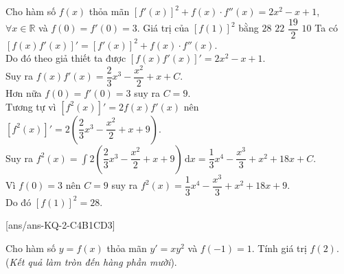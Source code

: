 \begin{ex}%
	Cho hàm số $ f(x)$ thỏa mãn $\left[f'(x)\right]^2+f(x)\cdot f''(x)=2x^2-x+1$, $\forall x\in\mathbb{R}$ và $ f(0)=f'(0)=3$. Giá trị của $\left[f(1)\right]^2$ bằng
	\choice
	{\True $ 28$}
	{$ 22$}
	{$\dfrac{19}{2}$}
	{$ 10$}
	\loigiai
	{
		Ta có $\left[f(x){f}'(x)\right]'=\left[f'(x)\right]^2+f(x)\cdot f''(x)$.\\
		Do đó theo giả thiết ta được $\left[f(x){f}'(x)\right]'=2x^2-x+1$.\\
		Suy ra $f(x){f}'(x)=\dfrac{2}{3}{x^3}-\dfrac{x^2}{2}+x+C$.\\
		Hơn nữa $ f(0)=f'(0)=3$ suy ra $ C=9$.\\
		Tương tự vì $\left[f^2(x)\right]'=2f(x){f}'(x)$ nên $\left[f^2(x)\right]'=2\left(\dfrac{2}{3}{x^3}-\dfrac{x^2}{2}+x+9\right)$.\\
		Suy ra $f^2(x)=\displaystyle\int{2\left(\dfrac{2}{3}{x^3}-\dfrac{x^2}{2}+x+9\right)\mathrm{\,d}x}=\dfrac{1}{3}{x^4}-\dfrac{x^3}{3}+x^2+18x+C$.\\
		Vì $ f(0)=3$ nên $C=9$ suy ra $f^2(x)=\dfrac{1}{3}{x^4}-\dfrac{x^3}{3}+x^2+18x+9$.\\
		Do đó $\left[f(1)\right]^2=28$.
	}
\end{ex}

{}[ans/ans-KQ-2-C4B1CD3]
\begin{ex}%
	Cho hàm số $ y=f(x)$ thỏa mãn $y'=x{y^2}$ và $ f\left(-1\right)=1$. Tính giá trị $f(2)$. (\textit{Kết quả làm tròn đến hàng phần mười}).
\end{ex}

